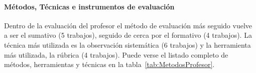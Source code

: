 

\paragraph*{Métodos, Técnicas e instrumentos de evaluación}

Dentro de la evaluación del profesor el método de evaluación más seguido vuelve a ser el sumativo (5 trabajos), seguido de cerca por el formativo (4 trabajos). La técnica más utilizada es la observación sistemática (6 trabajos) y la herramienta más utilizada, la rúbrica (4 trabajos). Puede verse el listado completo de métodos, herramientas y técnicas en la tabla~\ref{tab:MetodosProfesor}.

